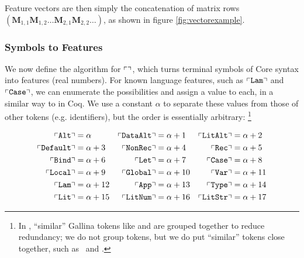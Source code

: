 Feature vectors are then simply the concatenation of matrix rows $(\mathbf{M}_{1,1} \mathbf{M}_{1,2} \dots \mathbf{M}_{2,1} \mathbf{M}_{2,2} \dots)$, as shown in figure \ref{fig:vectorexample}.

\subsubsection{Symbols to Features}

\iffalse TODO: Maybe present recurrent clustering in a ``naive'' way: define the conversion function ``[]'' recursively. Leave the dependency-ordering, etc. for the Algorithm section, as a way of ``building up to'' the result, which avoids the inefficiencies of recursing. \fi

We now define the algorithm for $\left\ulcorner  \right\urcorner$, which turns terminal symbols of Core syntax into features (real numbers). For known language features, such as $\left\ulcorner \texttt{Lam} \right\urcorner$ and $\left\ulcorner \texttt{Case} \right\urcorner$, we can enumerate the possibilities and assign a value to each, in a similar way to \cite{DBLP:journals/corr/HerasK14} in Coq. We use a constant $\alpha$ to separate these values from those of other tokens (e.g. identifiers), but the order is essentially arbitrary: \footnote{In \cite{DBLP:journals/corr/HerasK14}, ``similar'' Gallina tokens like  and  are grouped together to reduce redundancy; we do not group tokens, but we do put ``similar'' tokens close together, such as \CLocal\ and \CGlobal.}

\begin{align*}
  \left\ulcorner \texttt{Alt} \right\urcorner     &= \alpha      &
  \left\ulcorner \texttt{DataAlt} \right\urcorner &= \alpha + 1  &
  \left\ulcorner \texttt{LitAlt} \right\urcorner  &= \alpha + 2  \\
  \left\ulcorner \texttt{Default} \right\urcorner &= \alpha + 3  &
  \left\ulcorner \texttt{NonRec} \right\urcorner  &= \alpha + 4  &
  \left\ulcorner \texttt{Rec} \right\urcorner     &= \alpha + 5  \\
  \left\ulcorner \texttt{Bind} \right\urcorner    &= \alpha + 6  &
  \left\ulcorner \texttt{Let} \right\urcorner     &= \alpha + 7  &
  \left\ulcorner \texttt{Case} \right\urcorner    &= \alpha + 8  \\
  \left\ulcorner \texttt{Local} \right\urcorner   &= \alpha + 9  &
  \left\ulcorner \texttt{Global} \right\urcorner  &= \alpha + 10 &
  \left\ulcorner \texttt{Var} \right\urcorner     &= \alpha + 11 \\
  \left\ulcorner \texttt{Lam} \right\urcorner     &= \alpha + 12 &
  \left\ulcorner \texttt{App} \right\urcorner     &= \alpha + 13 &
  \left\ulcorner \texttt{Type} \right\urcorner    &= \alpha + 14 \\
  \left\ulcorner \texttt{Lit} \right\urcorner     &= \alpha + 15 &
  \left\ulcorner \texttt{LitNum} \right\urcorner  &= \alpha + 16 &
  \left\ulcorner \texttt{LitStr} \right\urcorner  &= \alpha + 17
\end{align*}

